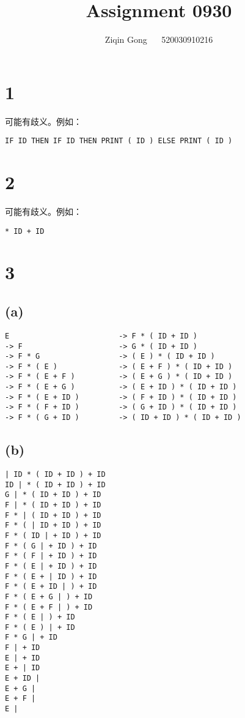 \documentclass[12pt]{article}
\title{Assignment 0930}
\author{Ziqin Gong $\quad$ 520030910216}
\date{}
\begin{document}
  \maketitle

  \section*{1}

    可能有歧义。例如：
    \begin{lstlisting}
IF ID THEN IF ID THEN PRINT ( ID ) ELSE PRINT ( ID )
    \end{lstlisting}

  \section*{2}
  
    可能有歧义。例如：
    \begin{lstlisting}
* ID + ID
    \end{lstlisting}

  \section*{3}
  \vspace{-10pt}

    \subsection*{(a)}

    \begin{lstlisting}
E                         -> F * ( ID + ID )
-> F                      -> G * ( ID + ID )
-> F * G                  -> ( E ) * ( ID + ID )
-> F * ( E )              -> ( E + F ) * ( ID + ID )
-> F * ( E + F )          -> ( E + G ) * ( ID + ID )
-> F * ( E + G )          -> ( E + ID ) * ( ID + ID )
-> F * ( E + ID )         -> ( F + ID ) * ( ID + ID )
-> F * ( F + ID )         -> ( G + ID ) * ( ID + ID )
-> F * ( G + ID )         -> ( ID + ID ) * ( ID + ID )
    \end{lstlisting}

    \subsection*{(b)}

    \begin{lstlisting}
| ID * ( ID + ID ) + ID
ID | * ( ID + ID ) + ID
G | * ( ID + ID ) + ID
F | * ( ID + ID ) + ID
F * | ( ID + ID ) + ID
F * ( | ID + ID ) + ID
F * ( ID | + ID ) + ID
F * ( G | + ID ) + ID
F * ( F | + ID ) + ID
F * ( E | + ID ) + ID
F * ( E + | ID ) + ID
F * ( E + ID | ) + ID
F * ( E + G | ) + ID
F * ( E + F | ) + ID
F * ( E | ) + ID
F * ( E ) | + ID
F * G | + ID
F | + ID
E | + ID
E + | ID
E + ID |
E + G |
E + F |
E |
    \end{lstlisting}
\end{document}
